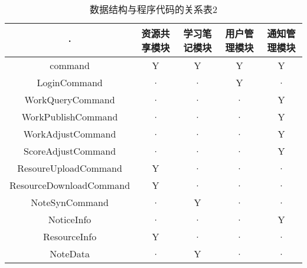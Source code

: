 \begin{table}[htbp]
\centering
\caption{数据结构与程序代码的关系表2} \label{tab:datastructure-module}
\begin{tabular}{|c|c|c|c|c|}
    \hline
    · &  资源共享模块 & 学习笔记模块 & 用户管理模块 & 通知管理模块  \\
    \hline
    command & Y & Y & Y & Y \\
    \hline
    LoginCommand & · & · & Y & · \\
    \hline
    WorkQueryCommand & · & · & · & Y \\
    \hline
    WorkPublishCommand & · & · & · & Y \\
    \hline
    WorkAdjustCommand & · & · & · & Y \\
    \hline
    ScoreAdjustCommand & · & · & · & Y \\
    \hline
    ResoureUploadCommand & Y & · & · & · \\
    \hline
    ResourceDownloadCommand & Y & · & · & · \\
    \hline
    NoteSynCommand & · & Y & · & · \\
    \hline
    NoticeInfo & · & · & · & Y \\
    \hline
    ResourceInfo & Y & · & · & · \\
    \hline
    NoteData & · & Y & · & · \\
    \hline
\end{tabular}
\end{table}
